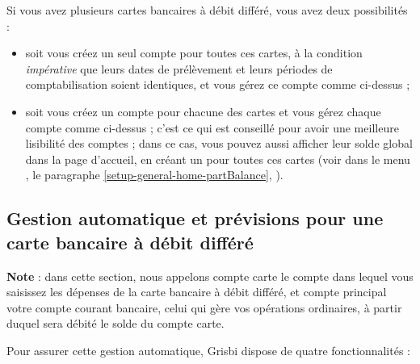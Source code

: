 Si vous avez plusieurs cartes bancaires à débit différé, vous avez deux possibilités :

\begin{itemize}
	\item soit vous créez un seul compte pour toutes ces cartes, à la condition \emph{impérative} que leurs dates de prélèvement et leurs périodes de comptabilisation soient identiques, et vous gérez ce compte comme ci-dessus ;
	\item soit vous créez un compte pour chacune des cartes et vous gérez chaque compte comme ci-dessus ; c'est ce qui est conseillé pour avoir une meilleure lisibilité des comptes ; dans ce cas, vous pouvez aussi afficher leur solde global dans la page d'accueil, en créant un  pour toutes ces cartes (voir dans le menu , le paragraphe \vref{setup-general-home-partBalance}, ).
\end{itemize}


\subsection{Gestion automatique et prévisions pour une carte bancaire à débit différé\label{bankcard-deferredCard-budget}}

\textbf{Note} : dans cette section, nous appelons \og compte carte \fg{} le compte dans lequel vous saisissez les dépenses de la carte bancaire à débit différé, et \og compte principal \fg{} votre compte courant bancaire, celui qui gère vos opérations ordinaires, à partir duquel sera débité le solde du compte carte.

Pour assurer cette gestion automatique, Grisbi dispose de quatre fonctionnalités : 

